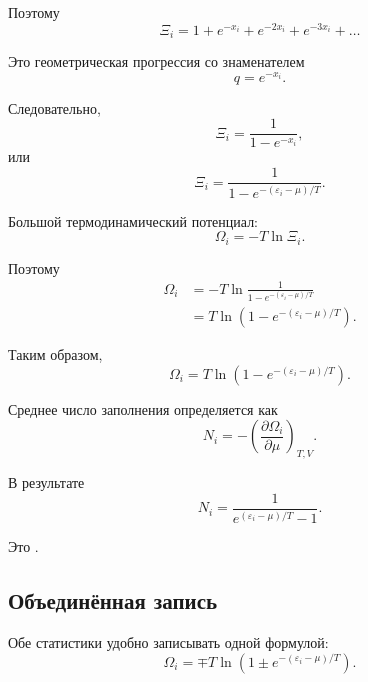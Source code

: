 \documentclass[../final.tex]{subfiles}
\begin{document}
Поэтому
%
\begin{equation*}
    \Xi_i
    =
    1
    +
    e^{-x_i}
    +
    e^{-2x_i}
    +
    e^{-3x_i}
    +
    \ldots
\end{equation*}

Это геометрическая прогрессия со знаменателем
%
\begin{equation*}
    q
    =
    e^{-x_i}.
\end{equation*}

Следовательно,
%
\begin{equation*}
    \Xi_i
    =
    \frac{1}{
        1-e^{-x_i}
    },
\end{equation*}
%
или
%
\[
    \boxed{
        \Xi_i
        =
        \frac{1}{
            1-e^{-(\varepsilon_i-\mu)/T}
        }
    }.
\]

Большой термодинамический потенциал:
%
\begin{equation*}
    \Omega_i
    =
    -T\ln\Xi_i.
\end{equation*}

Поэтому
%
\begin{align*}
    \Omega_i
    &=
    -T
    \ln
    \frac{1}{
        1-e^{-(\varepsilon_i-\mu)/T}
    }
    \\[4pt]
    &=
    T
    \ln
    \left(
        1-e^{-(\varepsilon_i-\mu)/T}
    \right).
\end{align*}

Таким образом,
%
\[
    \boxed{
        \Omega_i
        =
        T
        \ln
        \left(
            1-e^{-(\varepsilon_i-\mu)/T}
        \right)
    }.
\]

Среднее число заполнения определяется как
%
\begin{equation*}
    N_i
    =
    -
    \left(
        \frac{\partial\Omega_i}{\partial\mu}
    \right)_{T,V}.
\end{equation*}

В результате
%
\[
    \boxed{
        N_i
        =
        \frac{1}{
            e^{(\varepsilon_i-\mu)/T}-1
        }
    }.
\]

Это .


\subsection{Объединённая запись}

Обе статистики удобно записывать одной формулой:
%
\[
    \boxed{
        \Omega_i
        =
        \mp T
        \ln
        \left(
            1
            \pm
            e^{-(\varepsilon_i-\mu)/T}
        \right)
    }.
\]
\end{document}
